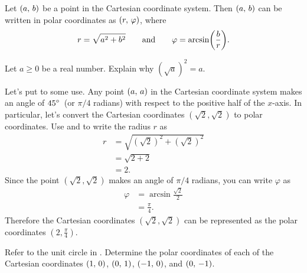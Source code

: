 \documentclass[a4paper,oneside,12pt]{article}
\begin{document}
\begin{theorem}
\label{thm:convert_Cartesian_to_polar_coordinates}
Let $\left\lparen{a},\, {b}\right\rparen$ be a point in the Cartesian coordinate system.
Then $\left\lparen{a},\, {b}\right\rparen$ can be written in polar coordinates as
$\left\lparen{r},\, {\varphi}\right\rparen$, where
\[
r
=
\sqrt{a^2 + b^2}
\qquad
\text{and}
\qquad
\varphi
=
\arcsin\parenthesis*{\frac{b}{r}}.
\]
\end{theorem}

\begin{exercise}
\label{ex:square_root_of_a_squared}
Let $a \geq 0$ be a real number.  Explain why $(\sqrt{a})^2 = a$.
\end{exercise}


Let's put  to some
use.  Any point $\left\lparen{a},\, {a}\right\rparen$ in the Cartesian coordinate system
makes an angle of ${45}^{\circ}$~(or $\pi / 4$ radians) with respect to
the positive half of the $x$-axis.  In particular, let's convert the
Cartesian coordinates $(\sqrt{2}\comma \sqrt{2})$ to polar
coordinates.  Use 
and  to write the radius $r$ as
\begin{align*}
r
&=
\sqrt{
  (\sqrt{2})^2 + (\sqrt{2})^2
} \\[4pt]
&=
\sqrt{2 + 2} \\[4pt]
&=
2.
\end{align*}
Since the point $(\sqrt{2}\comma \sqrt{2})$ makes an angle of
$\pi / 4$ radians, you can write $\varphi$ as
\begin{align*}
\varphi
&=
\arcsin\frac{\sqrt{2}}{2} \\[4pt]
&=
\frac{\pi}{4}.
\end{align*}
Therefore the Cartesian coordinates $(\sqrt{2}\comma \sqrt{2})$ can be
represented as the polar coordinates $(2\comma \frac{\pi}{4})$.

\begin{exercise}
Refer to the unit circle in .
Determine the polar coordinates of each of the Cartesian coordinates
$\left\lparen{1},\, {0}\right\rparen$, $\left\lparen{0},\, {1}\right\rparen$, $\left\lparen{-1},\, {0}\right\rparen$, and $\left\lparen{0},\, {-1}\right\rparen$.
\end{exercise}
\end{document}
